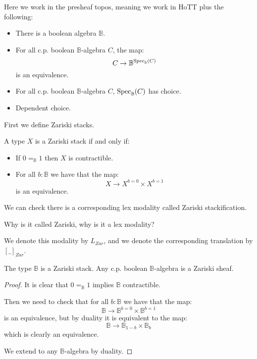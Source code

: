Here we work in the presheaf topos, meaning we work in HoTT plus the following:

\begin{itemize}
\item There is a boolean algebra $\mathbb{B}$.
\item For all c.p. boolean $\mathbb{B}$-algebra $C$, the map:
\[C \to \mathbb{B}^{\operatorname{Spec}_\mathbb{B}(C)}\]
is an equivalence.
\item For all c.p. boolean $\mathbb{B}$-algebra $C$, $\operatorname{Spec}_\mathbb{B}(C)$ has choice.
\item Dependent choice.
\end{itemize}

First we define Zariski stacks.

\begin{definition}\label{zariski-characterisation}
A type $X$ is a Zariski stack if and only if:
\begin{itemize}
\item If $0=_\mathbb{B}1$ then $X$ is contractible.
\item For all $b:\mathbb{B}$ we have that the map:
\[X\to X^{b=0}\times X^{b=1}\]
is an equivalence.
\end{itemize}
\end{definition}

We can check there is a corresponding lex modality called Zariski stackification. 

\begin{remark}
Why is it called Zariski, why is it a lex modality? 
\end{remark}


We denote this modality by $L_{Zar}$, and we denote the corresponding translation by $[\_]_{Zar}$.

\begin{lemma}\label{zariski-subcanonical}
The type $\mathbb{B}$ is a Zariski stack. Any c.p. boolean $\mathbb{B}$-algebra is a Zariski sheaf.
\end{lemma}

\begin{proof}
It is clear that $0=_\mathbb{B}1$ implies $\mathbb{B}$ contractible.

Then we need to check that for all $b:\mathbb{B}$ we have that the map:
\[\mathbb{B} \to \mathbb{B}^{b=0}\times\mathbb{B}^{b=1}\]
is an equivalence, but by duality it is equivalent to the map:
\[\mathbb{B} \to \mathbb{B}_{1-b}\times\mathbb{B}_b\]
which is clearly an equivalence.

We extend to any $\mathbb{B}$-algebra by duality.
\end{proof}

